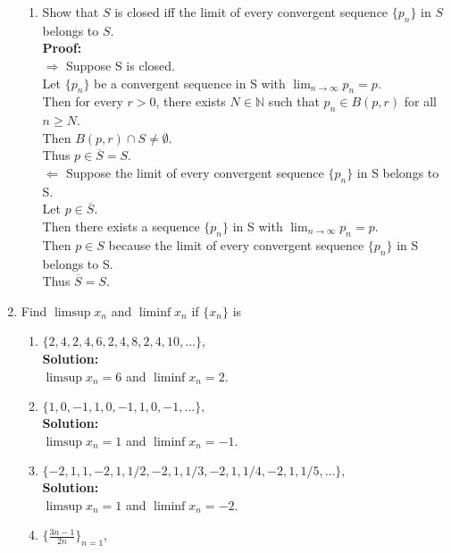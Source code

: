 \documentclass{article}
\begin{document}
\begin{enumerate}
\begin{enumerate}
    \item Show that $S$ is closed iff the limit of every convergent sequence $\{p_n\}$ in $S$ belongs to $S$.\\

\textbf{Proof:} \\

$\Rightarrow$ Suppose S is closed. \\
Let $\{p_n\}$ be a convergent sequence in S with $\lim_{n\to \infty} p_n = p$. \\
Then for every $r > 0$, there exists $N \in \mathbb{N}$ such that $p_n \in B(p,r)$ for all $n \geq N$. \\
Then $B(p,r) \cap S \neq \emptyset$. \\
Thus $p \in \overline{S} = S$.\\

$\Leftarrow$ Suppose the limit of every convergent sequence $\{p_n\}$ in S belongs to S. \\
Let $p \in \overline{S}$. \\
Then there exists a sequence $\{p_n\}$ in S with $\lim_{n\to \infty} p_n = p$. \\
Then $p \in S$ because the limit of every convergent sequence $\{p_n\}$ in S belongs to S. \\
Thus $\overline{S} = S$.\\
    \end{enumerate} 
\item Find $\limsup x_n$ and $\liminf x_n$ if $\{x_n\}$ is
\begin{enumerate}
    \item $\{2,4,2,4,6,2,4,8,2,4,10,\dots \}$,\\

    \textbf{Solution:} \\ 
    $\limsup x_n = 6$ and $\liminf x_n = 2$.\\
    \item $\{1,0,-1,1,0,-1,1,0,-1,\dots \},$\\

    \textbf{Solution:} \\ 
    $\limsup x_n = 1$ and $\liminf x_n = -1$.\\
    \item $\{-2,1,1,-2,1,1/2,-2,1,1/3,-2,1,1/4,-2,1,1/5, \dots\},$\\
    
    \textbf{Solution:} \\ 
    $\limsup x_n = 1$ and $\liminf x_n = -2$.\\
    \item $\{\frac{3n - 1}{2n}\}_{n=1}$,\\
    

\end{enumerate}
\end{enumerate}
\end{document}
